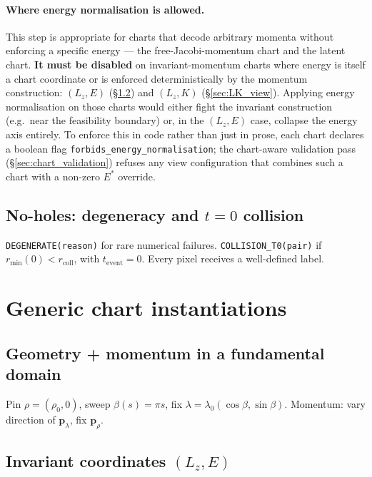 \documentclass[11pt]{report}
\def\boldsymbol#1{#1}%
\begin{document}
\paragraph{Where energy normalisation is allowed.} This step is appropriate for charts that decode arbitrary momenta without enforcing a specific energy --- the free-Jacobi-momentum chart and the latent chart. \textbf{It must be disabled} on invariant-momentum charts where energy is itself a chart coordinate or is enforced deterministically by the momentum construction: $(L_z,E)$ (\S\ref{sec:LE_view}) and $(L_z,K)$ (\S\ref{sec:LK_view}). Applying energy normalisation on those charts would either fight the invariant construction (e.g.\ near the feasibility boundary) or, in the $(L_z,E)$ case, collapse the energy axis entirely. To enforce this in code rather than just in prose, each chart declares a boolean flag \texttt{forbids\_energy\_normalisation}; the chart-aware validation pass (\S\ref{sec:chart_validation}) refuses any view configuration that combines such a chart with a non-zero $E^*$ override.

\subsection{No-holes: degeneracy and $t=0$ collision}
\label{sec:no_holes_impl}

\texttt{DEGENERATE(reason)} for rare numerical failures. \texttt{COLLISION\_T0(pair)} if $r_{\min}(0)<r_{\text{coll}}$, with $t_{\text{event}}=0$. Every pixel receives a well-defined label.

\section{Generic chart instantiations}
\label{sec:views}

\subsection{Geometry + momentum in a fundamental domain}
\label{sec:geom_mom_view}

Pin $\boldsymbol\rho=(\rho_0,0)$, sweep $\beta(s)=\pi s$, fix $\boldsymbol\lambda=\lambda_0(\cos\beta,\sin\beta)$. Momentum: vary direction of $\mathbf p_\lambda$, fix $\mathbf p_\rho$.

\subsection{Invariant coordinates $(L_z,E)$}
\label{sec:LE_view}
\end{document}
